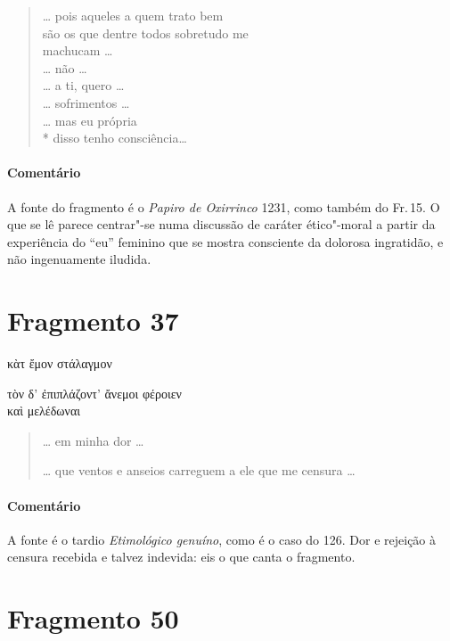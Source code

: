 \begin{verse}
\ldots{} pois aqueles a quem trato bem\\
são os que dentre todos sobretudo me\\
machucam \ldots{}\\
\ldots{} não \ldots{}\\
\ldots{} a ti, quero \ldots{}\\
\ldots{} sofrimentos \ldots{}\\
\ldots{} mas eu própria\\*
disso tenho consciência\ldots{}
\end{verse}

{\paragraph{Comentário} A fonte do fragmento é o \textit{Papiro de Oxirrinco} 1231, como também do Fr.\,15. O que se lê parece centrar"-se numa discussão de caráter ético"-moral
a partir da experiência do “eu” feminino que se mostra consciente da dolorosa
ingratidão, e não ingenuamente iludida.}



\pagebreak
\section{Fragmento 37}

\begin{gkverse}
κὰτ ἔμον στάλαγμον

\ast\quad\ast\quad\ast

τὸν δ’ ἐπιπλάζοντ’ ἄνεμοι φέροιεν\\
      καὶ μελέδωναι
\end{gkverse}

\begin{verse}
\ldots{} em minha dor \ldots{}

\ast\quad\ast\quad\ast

\ldots{} que ventos e anseios carreguem a ele que me censura \ldots{}
\end{verse}

{\paragraph{Comentário} A fonte é o tardio \textit{Etimológico genuíno}, como é o caso do 126. Dor e
rejeição à censura recebida e talvez indevida: eis o que canta o fragmento.}


\section{Fragmento 50}

